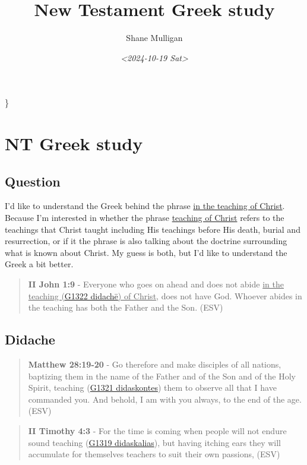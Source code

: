 \documentclass[11pt]{article}
\author{Shane Mulligan}
\date{\textit{<2024-10-19 Sat>}}
\title{New Testament Greek study}
\begin{document}
\maketitle
\makeatletter
\renewcommand\verbatim@font\{\normalfont{}\ttfamily\}
\makeatother

\section{NT Greek study}
\label{sec:orgbd44c0d}

\subsection{Question}
\label{sec:orgbb34d1e}

I'd like to understand the Greek behind the phrase \uline{in the teaching of Christ}.
Because I'm interested in whether the phrase \uline{teaching of Christ} refers to the teachings that Christ
taught including His teachings before His death, burial and resurrection, or
if it the phrase is also talking about the doctrine surrounding what is known about Christ.
My guess is both, but I'd like to understand the Greek a bit better.

\begin{quote}
\textbf{II John 1:9} - Everyone who goes on ahead and does not abide \uline{in the teaching (\href{https://biblehub.com/greek/1321.htm}{G1322 didachē}) of Christ}, does not have God. Whoever abides in the teaching has both the Father and the Son. (ESV)
\end{quote}

\subsection{Didache}
\label{sec:org63f411f}
\begin{quote}
\textbf{Matthew 28:19-20} - Go therefore and make disciples of all nations, baptizing them in the name of the Father and of the Son and of the Holy Spirit, teaching (\href{https://biblehub.com/greek/1321.htm}{G1321 didaskontes}) them to observe all that I have commanded you. And behold, I am with you always, to the end of the age. (ESV)
\end{quote}

\begin{quote}
\textbf{II Timothy 4:3} - For the time is coming when people will not endure sound teaching (\href{https://biblehub.com/greek/1319.htm}{G1319 didaskalias}), but having itching ears they will accumulate for themselves teachers to suit their own passions, (ESV)
\end{quote}
\end{document}
